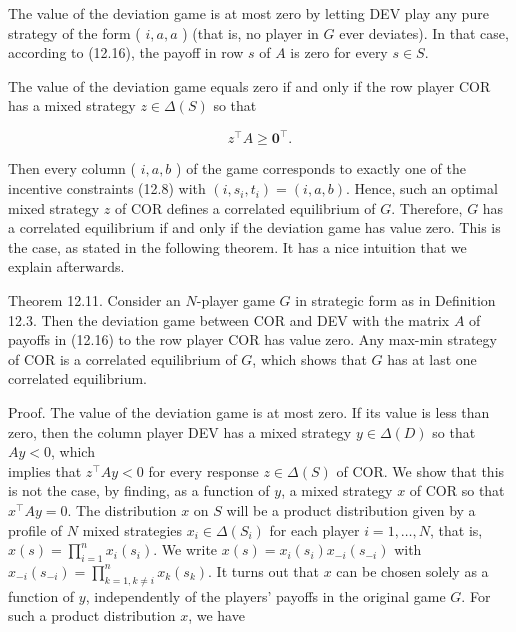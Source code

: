 \documentclass[12pt]{article}
\begin{document}
The value of the deviation game is at most zero by letting DEV play any pure strategy of the form ( $i, a, a$ ) (that is, no player in $G$ ever deviates). In that case, according to (12.16), the payoff in row $s$ of $A$ is zero for every $s \in S$.

The value of the deviation game equals zero if and only if the row player COR has a mixed strategy $z \in \Delta(S)$ so that


\begin{equation*}
z^{\top} A \geq \mathbf{0}^{\top} . \tag{12.17}
\end{equation*}


Then every column ( $i, a, b$ ) of the game corresponds to exactly one of the incentive constraints (12.8) with $\left(i, s_{i}, t_{i}\right)=(i, a, b)$. Hence, such an optimal mixed strategy $z$ of COR defines a correlated equilibrium of $G$. Therefore, $G$ has a correlated equilibrium if and only if the deviation game has value zero. This is the case, as stated in the following theorem. It has a nice intuition that we explain afterwards.

Theorem 12.11. Consider an $N$-player game $G$ in strategic form as in Definition 12.3. Then the deviation game between COR and DEV with the matrix $A$ of payoffs in (12.16) to the row player COR has value zero. Any max-min strategy of COR is a correlated equilibrium of $G$, which shows that $G$ has at last one correlated equilibrium.

Proof. The value of the deviation game is at most zero. If its value is less than zero, then the column player DEV has a mixed strategy $y \in \Delta(D)$ so that $A y<0$, which\\
implies that $z^{\top} A y<0$ for every response $z \in \Delta(S)$ of COR. We show that this is not the case, by finding, as a function of $y$, a mixed strategy $x$ of COR so that $x^{\top} A y=0$. The distribution $x$ on $S$ will be a product distribution given by a profile of $N$ mixed strategies $x_{i} \in \Delta\left(S_{i}\right)$ for each player $i=1, \ldots, N$, that is, $x(s)=\prod_{i=1}^{n} x_{i}\left(s_{i}\right)$. We write $x(s)=x_{i}\left(s_{i}\right) x_{-i}\left(s_{-i}\right)$ with $x_{-i}\left(s_{-i}\right)=\prod_{k=1, k \neq i}^{n} x_{k}\left(s_{k}\right)$. It turns out that $x$ can be chosen solely as a function of $y$, independently of the players' payoffs in the original game $G$. For such a product distribution $x$, we have
\end{document}
